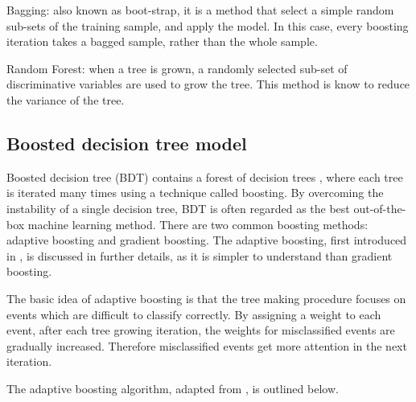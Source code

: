 Bagging: also known as boot-strap, it is a method that select a simple random sub-sets of the training sample, and apply the model. In this case, every boosting iteration takes a bagged sample, rather than the whole sample.

Random Forest: when a tree is grown, a randomly selected sub-set of discriminative variables are used to grow the tree. This method is know to reduce the variance of the tree.

\subsection{Boosted decision tree model}
\label{sec:analysisBDT}

Boosted decision tree (BDT) contains a forest of decision trees , where each tree is iterated many times using a technique called boosting.   By overcoming the instability of a single  decision tree, BDT is often regarded as  the best out-of-the-box machine learning method. There are two common boosting methods: adaptive boosting and gradient boosting. The adaptive boosting,  first introduced in \cite{FREUND1997119}, is discussed in further details, as it is simpler to understand than gradient boosting.

The basic idea of adaptive boosting is that the tree making procedure focuses on events which are difficult to classify correctly. By assigning a weight to each event,   after each tree growing iteration, the weights for misclassified events are gradually increased. Therefore misclassified events get more attention in the next iteration.



The adaptive boosting algorithm, adapted from \cite{hastie2009elements},  is outlined below.

